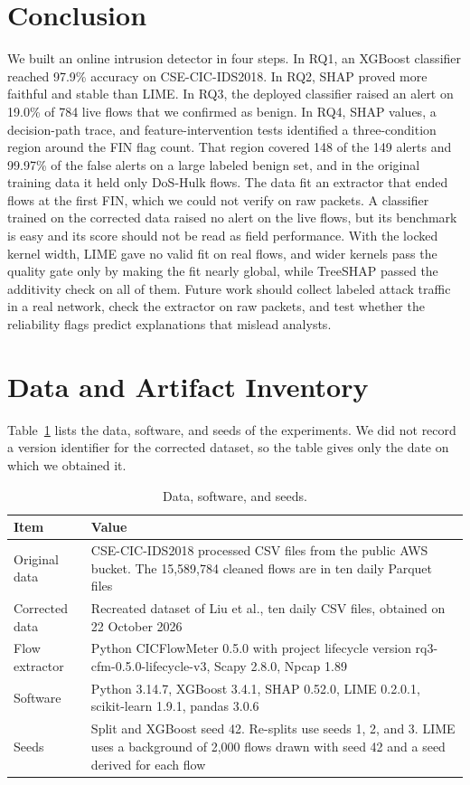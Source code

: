 \documentclass[conference]{IEEEtran}
\begin{document}
\section{Conclusion}
We built an online intrusion detector in four steps. In RQ1, an XGBoost classifier reached 97.9\% accuracy on CSE-CIC-IDS2018. In RQ2, SHAP proved more faithful and stable than LIME. In RQ3, the deployed classifier raised an alert on 19.0\% of 784 live flows that we confirmed as benign. In RQ4, SHAP values, a decision-path trace, and feature-intervention tests identified a three-condition region around the FIN flag count. That region covered 148 of the 149 alerts and 99.97\% of the false alerts on a large labeled benign set, and in the original training data it held only DoS-Hulk flows. The data fit an extractor that ended flows at the first FIN, which we could not verify on raw packets. A classifier trained on the corrected data raised no alert on the live flows, but its benchmark is easy and its score should not be read as field performance. With the locked kernel width, LIME gave no valid fit on real flows, and wider kernels pass the quality gate only by making the fit nearly global, while TreeSHAP passed the additivity check on all of them. Future work should collect labeled attack traffic in a real network, check the extractor on raw packets, and test whether the reliability flags predict explanations that mislead analysts.

\appendices
\section{Data and Artifact Inventory}
Table~\ref{tab:inventory} lists the data, software, and seeds of the experiments. We did not record a version identifier for the corrected dataset, so the table gives only the date on which we obtained it.

\begin{table}[h]
\caption{Data, software, and seeds.}
\label{tab:inventory}
\centering
\footnotesize
\begin{tabular}{>{\raggedright\arraybackslash}p{0.95in}>{\raggedright\arraybackslash}p{2.1in}}
\toprule
Item & Value \\
\midrule
Original data & CSE-CIC-IDS2018 processed CSV files from the public AWS bucket. The 15,589,784 cleaned flows are in ten daily Parquet files \\
Corrected data & Recreated dataset of Liu et al., ten daily CSV files, obtained on 22 October 2026 \\
Flow extractor & Python CICFlowMeter 0.5.0 with project lifecycle version rq3-cfm-0.5.0-lifecycle-v3, Scapy 2.8.0, Npcap 1.89 \\
Software & Python 3.14.7, XGBoost 3.4.1, SHAP 0.52.0, LIME 0.2.0.1, scikit-learn 1.9.1, pandas 3.0.6 \\
Seeds & Split and XGBoost seed 42. Re-splits use seeds 1, 2, and 3. LIME uses a background of 2,000 flows drawn with seed 42 and a seed derived for each flow \\
\bottomrule
\end{tabular}
\end{table}

\balance


\end{document}
